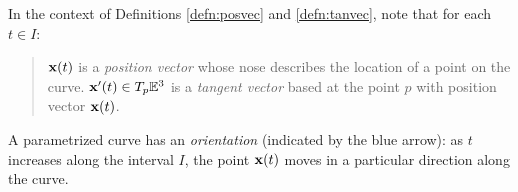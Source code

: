
In the context of Definitions \ref{defn:posvec} and \ref{defn:tanvec}, note that for each $t\in I$:
\begin{quote}
	${\mathbf{x}}(t)$ is a \emph{position vector} whose nose describes the location of a point on the curve.\smallbreak
	${\mathbf{x}}'(t)\in T_p\mathbb{E}^3$ is a \emph{tangent vector} based at the point $p$ with position vector ${\mathbf{x}}(t)$.
\end{quote}

A parametrized curve has an \emph{orientation} (indicated by the blue arrow): as $t$ increases along the interval $I$, the point ${\mathbf{x}}(t)$ moves in a particular direction along the curve.


